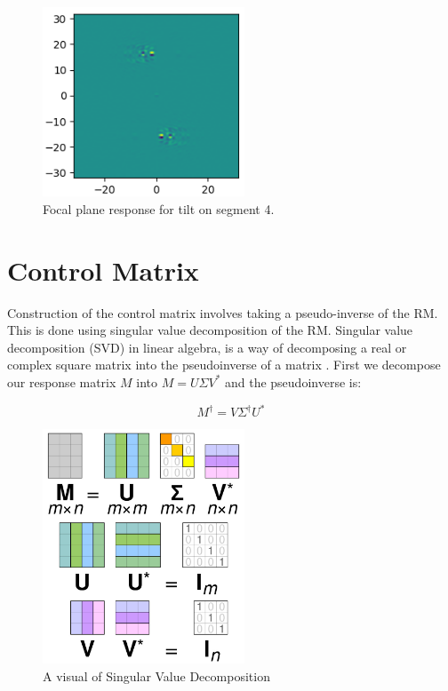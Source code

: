 \begin{figure}[H]
    \centering
    \includegraphics[width = 6cm]{Figures/I_diff.png}
    \caption{Focal plane response for tilt on segment 4.}
    \label{fig:I_diff}
\end{figure}



\section{Control Matrix}

Construction of the control matrix involves taking a pseudo-inverse of the RM.  This is done using singular value
decomposition of the RM.  Singular value decomposition (SVD) in linear algebra, is a way of decomposing a real or
complex square matrix into the pseudoinverse of a matrix \cite{Hestenes1958InversionResults}.  First we decompose
our response matrix $M$ into $M = U \Sigma V^{\ast}$ and the pseudoinverse is:

\begin{equation}
    M^{\dagger} = V \Sigma^{\dagger} U^{\ast}
    \label{eq:SVD}
\end{equation}

\begin{figure}[H]
    \centering
    \includegraphics[width = 6cm]{Figures/Singular_value_decomposition_visualisation.jpg}
    \caption{A visual of Singular Value Decomposition}
    \label{fig:SVD}
\end{figure}


